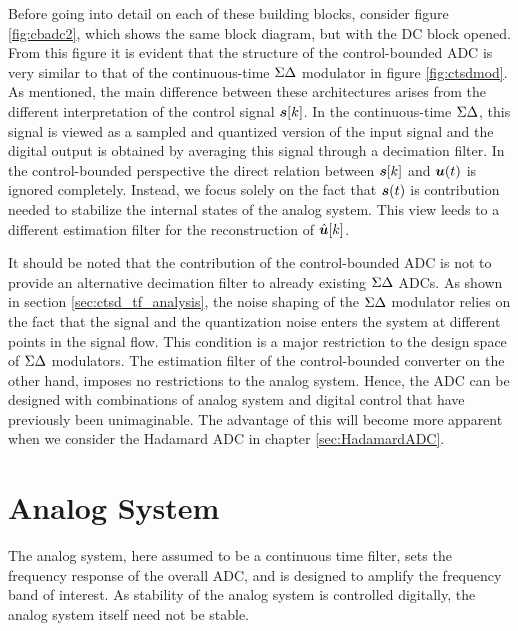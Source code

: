 Before going into detail on each of these building blocks, consider figure \ref{fig:cbadc2}, which shows the same block diagram, but with the DC block opened. From this figure it is evident that the structure of the control-bounded ADC is very similar to that of the continuous-time $\Sigma\Delta$ modulator in figure \ref{fig:ctsdmod}. As mentioned, the main difference between these architectures arises from the different interpretation of the control signal $\bm{s}[k]$. In the continuous-time $\Sigma\Delta$, this signal is viewed as a sampled and quantized version of the input signal and the digital output is obtained by averaging this signal through a decimation filter. In the control-bounded perspective the direct relation between $\bm{s}[k]$ and $\bm{u}(t)$ is ignored completely. Instead, we focus solely on the fact that $\bm{s}(t)$ is contribution needed to stabilize the internal states of the analog system. This view leeds to a different estimation filter for the reconstruction of $\hat{\bm{u}}[k]$.

It should be noted that the contribution of the control-bounded ADC is not to provide an alternative decimation filter to already existing $\Sigma\Delta$ ADCs. As shown in section \ref{sec:ctsd_tf_analysis}, the noise shaping of the $\Sigma\Delta$ modulator relies on the fact that the signal and the quantization noise enters the system at different points in the signal flow. This condition is a major restriction to the design space of $\Sigma\Delta$ modulators. The estimation filter of the control-bounded converter on the other hand, imposes no restrictions to the analog system. Hence, the ADC can be designed with combinations of analog system and digital control that have previously been unimaginable. The advantage of this will become more apparent when we consider the Hadamard ADC in chapter \ref{sec:HadamardADC}.



























\section{Analog System}
\label{subsec:analog_system}
The analog system, here assumed to be a continuous time filter, sets the frequency response of the overall ADC, and is designed to amplify the frequency band of interest. As stability of the analog system is controlled digitally, the analog system itself need not be stable.

